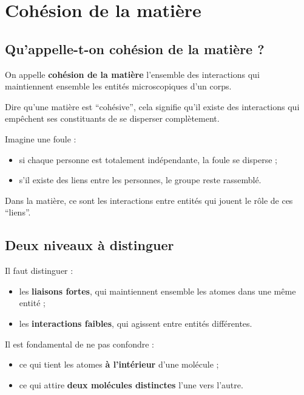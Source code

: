 \documentclass[11pt,a4paper]{article}
\begin{document}
\section{Cohésion de la matière}

\subsection{Qu’appelle-t-on cohésion de la matière ?}

\begin{definitionbox}
On appelle \textbf{cohésion de la matière} l’ensemble des interactions qui maintiennent ensemble les entités microscopiques d’un corps.
\end{definitionbox}

\begin{comprendrebox}
Dire qu’une matière est ``cohésive'', cela signifie qu’il existe des interactions qui empêchent ses constituants de se disperser complètement.
\end{comprendrebox}

\begin{analogebox}
Imagine une foule :
\begin{itemize}
    \item si chaque personne est totalement indépendante, la foule se disperse ;
    \item s’il existe des liens entre les personnes, le groupe reste rassemblé.
\end{itemize}
Dans la matière, ce sont les interactions entre entités qui jouent le rôle de ces ``liens''.
\end{analogebox}

\subsection{Deux niveaux à distinguer}

Il faut distinguer :
\begin{itemize}
    \item les \textbf{liaisons fortes}, qui maintiennent ensemble les atomes dans une même entité ;
    \item les \textbf{interactions faibles}, qui agissent entre entités différentes.
\end{itemize}

\begin{attentionbox}
Il est fondamental de ne pas confondre :
\begin{itemize}
    \item ce qui tient les atomes \textbf{à l’intérieur} d’une molécule ;
    \item ce qui attire \textbf{deux molécules distinctes} l’une vers l’autre.
\end{itemize}
\end{attentionbox}
\end{document}
